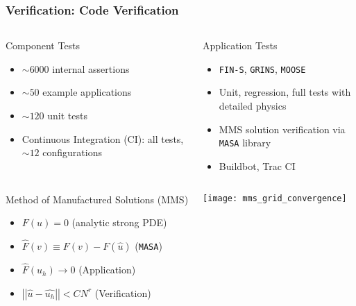 \documentclass[mathserif]{beamer}
\newcommand{\norm}[1]{\ensuremath{ \left|\left|#1\right|\right|}}
\begin{document}
\begin{frame}
\frametitle{Verification: Code Verification}

\begin{columns}
\begin{block}{Component Tests}
\begin{itemize}
\item $\sim 6000$ internal assertions
\item $\sim 50$ example applications 
\item $\sim 120$ unit tests
\item Continuous Integration (CI): all tests, $\sim 12$ configurations
\end{itemize}
\end{block}

\begin{block}{Application Tests}
\begin{itemize}
\item \texttt{FIN-S}, \texttt{GRINS}, \texttt{MOOSE}
\item Unit, regression, full tests with detailed physics
\item MMS solution verification via {\texttt{MASA}} library
\item Buildbot, Trac CI
\end{itemize}
\end{block}
\end{columns}

\begin{columns}
\begin{block}{Method of Manufactured Solutions (MMS)}
\begin{itemize}
	\item $F(u) = 0$ (analytic strong PDE)
	\item $\hat{F}(v) \equiv F(v) - F(\hat{u})$ ({\texttt{MASA}})
	\item $\hat{F}(u_h) \rightarrow 0$ (Application)
	\item $\norm{\hat{u} - \hat{u_h}} < C N^r$ (Verification)
\end{itemize}
\end{block}

\center
\texttt{[image: mms\_grid\_convergence]}

\end{columns}

\end{frame}
\end{document}
